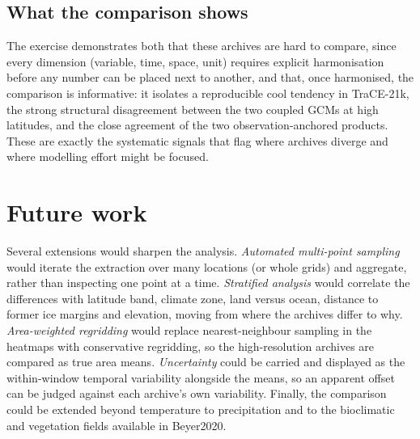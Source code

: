 \documentclass{isprs} %
\begin{document}
\subsection{What the comparison shows}
The exercise demonstrates both that these archives are hard to compare, since every dimension (variable, time, space, unit) requires explicit harmonisation before any number can be placed next to another, and that, once harmonised, the comparison is informative: it isolates a reproducible cool tendency in TraCE-21k, the strong structural disagreement between the two coupled GCMs at high latitudes, and the close agreement of the two observation-anchored products. These are exactly the systematic signals that flag where archives diverge and where modelling effort might be focused.

\section{Future work}
Several extensions would sharpen the analysis. \emph{Automated multi-point sampling} would iterate the extraction over many locations (or whole grids) and aggregate, rather than inspecting one point at a time. \emph{Stratified analysis} would correlate the differences with latitude band, climate zone, land versus ocean, distance to former ice margins and elevation, moving from where the archives differ to why. \emph{Area-weighted regridding} would replace nearest-neighbour sampling in the heatmaps with conservative regridding, so the high-resolution archives are compared as true area means. \emph{Uncertainty} could be carried and displayed as the within-window temporal variability alongside the means, so an apparent offset can be judged against each archive's own variability. Finally, the comparison could be extended beyond temperature to precipitation and to the bioclimatic and vegetation fields available in Beyer2020.
\end{document}
